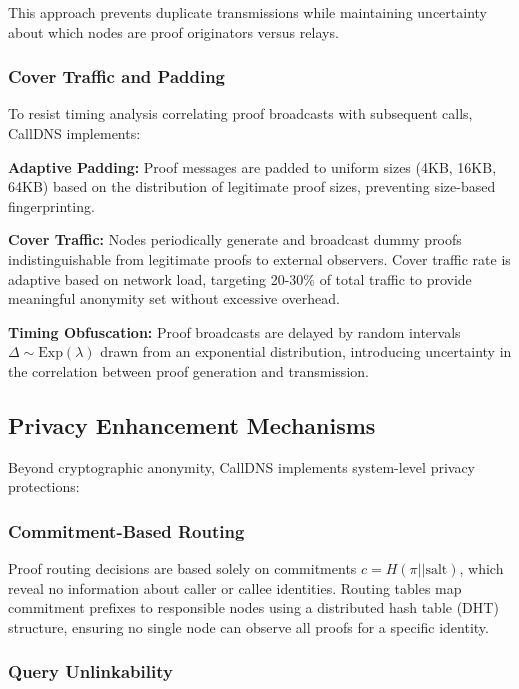\documentclass[11pt,twocolumn]{article}
\begin{document}
This approach prevents duplicate transmissions while maintaining uncertainty about which nodes are proof originators versus relays.

\subsubsection{Cover Traffic and Padding}

To resist timing analysis correlating proof broadcasts with subsequent calls, CallDNS implements:

\textbf{Adaptive Padding:} Proof messages are padded to uniform sizes (4KB, 16KB, 64KB) based on the distribution of legitimate proof sizes, preventing size-based fingerprinting.

\textbf{Cover Traffic:} Nodes periodically generate and broadcast dummy proofs indistinguishable from legitimate proofs to external observers. Cover traffic rate is adaptive based on network load, targeting 20-30\% of total traffic to provide meaningful anonymity set without excessive overhead.

\textbf{Timing Obfuscation:} Proof broadcasts are delayed by random intervals $\Delta \sim \text{Exp}(\lambda)$ drawn from an exponential distribution, introducing uncertainty in the correlation between proof generation and transmission.

\subsection{Privacy Enhancement Mechanisms}

Beyond cryptographic anonymity, CallDNS implements system-level privacy protections:

\subsubsection{Commitment-Based Routing}

Proof routing decisions are based solely on commitments $c = H(\pi || \text{salt})$, which reveal no information about caller or callee identities. Routing tables map commitment prefixes to responsible nodes using a distributed hash table (DHT) structure, ensuring no single node can observe all proofs for a specific identity.

\subsubsection{Query Unlinkability}
\end{document}
